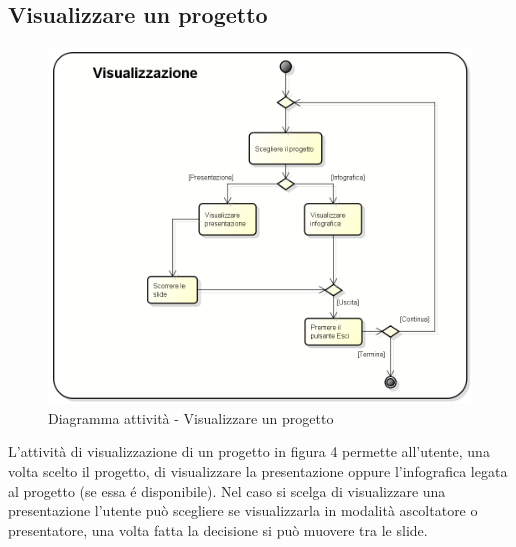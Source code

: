 \subsection{Visualizzare un progetto}
\begin{figure}[h] 
	\centering 
	\includegraphics[scale=0.3] {img/activity_visualizza.png} 
	\caption{Diagramma attività - Visualizzare un progetto} 
\end{figure}
L'attività di visualizzazione di un progetto in figura 4 permette all'utente, una volta scelto il progetto, di visualizzare la presentazione oppure l'\gls{infografica} legata al progetto (se essa é disponibile). Nel caso si scelga di visualizzare una presentazione l'utente può scegliere se visualizzarla in modalità ascoltatore o presentatore, una volta fatta la decisione si può muovere tra le slide.
\newpage



